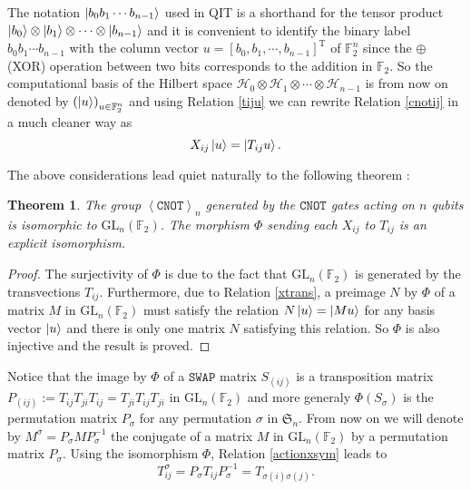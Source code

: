 \documentclass[a4paper,12pt,fleqn]{article}
\newcommand\swap{\mathtt{SWAP}}
\newcommand\cnot{\mathtt{CNOT}}
\newcommand\HH{\mathcal{H}}
\newcommand\F{\mathbb{F}}
\newcommand\SYM[1][n]{\mathfrak{S}_{#1}}
\newcommand\XG[1][n]{\left<\cnot\right>_{#1}}
\newcommand\GL[1][n]{\mathrm{GL}_{#1}(\mathbb{F}_2)}
\newtheorem{theo}{Theorem}
\begin{document}
The notation $\ket{b_0b_1\cdots b_{n-1}}$ used in QIT is a shorthand for the tensor product $\ket{b_0}\otimes\ket{b_1}\otimes\dots\otimes\ket{b_{n-1}}$
and it is convenient to identify the binary  label $ b_0b_1\cdots b_{n-1}$ with the column vector $u=[b_0,b_1,\cdots,b_{n-1}]^{\mathrm{T}}$ of $\F_2^n$ since the $\oplus$ (XOR) operation between two bits corresponds to the addition in $\F_2$.  
So the computational basis of the Hilbert space $\HH_0\otimes \HH_1\otimes\cdots\otimes \HH_{n-1}$ is from now on denoted by $\left(\ket{u}\right)_{u\in\F_2^n}$
and using Relation \eqref{tiju} we can rewrite Relation \eqref{cnotij} in a much cleaner way as
\begin{equation}\label{xtrans} 
  X_{ij}\ket{u}=\ket{T_{ij}u}.
\end{equation}

The above considerations lead quiet naturally to the following theorem :

\begin{theo} \label{iso}The group $\XG$ generated by the $\cnot$ gates acting on $n$ qubits is isomorphic to $\GL$.
  The morphism $\Phi$ sending each $X_{ij}$ to $T_{ij}$ is an explicit isomorphism.
\end{theo}

\begin{proof}
  The surjectivity of $\Phi$ is due to the fact that $\GL$ is generated by the transvections $T_{ij}$.
  Furthermore, due to Relation \eqref{xtrans}, a preimage $N$ by $\Phi$ of a matrix $M$ in $\GL$ must satisfy
  the relation $N\ket{u}=\ket{Mu}$ for any basis vector $\ket{u}$ and there is only one matrix $N$ satisfying this relation.
  So $\Phi$ is also injective and the result is proved.
\end{proof}

Notice that the image by $\Phi$ of a  $\swap$ matrix $S_{(ij)}$ is a transposition matrix $P_{(ij)}:=T_{ij}T_{ji}T_{ij}=T_{ji}T_{ij}T_{ji}$ in
$\GL$ and more generaly $\Phi(S_{\sigma})$ is the permutation matrix $P_{\sigma}$ for any permutation $\sigma$ in $\SYM$.
From now on we will denote by $M^{\sigma}=P_{\sigma}MP_{\sigma}^{-1}$ the conjugate of a matrix $M$ in $\GL$ by a permutation matrix $P_{\sigma}$. Using the isomorphism $\Phi$, Relation \eqref{actionxsym}
leads to 
\begin{equation} T_{ij}^{\sigma}=P_{\sigma}T_{ij}P_{\sigma}^{-1}=T_{\sigma(i) \sigma(j)}.\label{actiontsym}\end{equation}

\medskip
\end{document}
